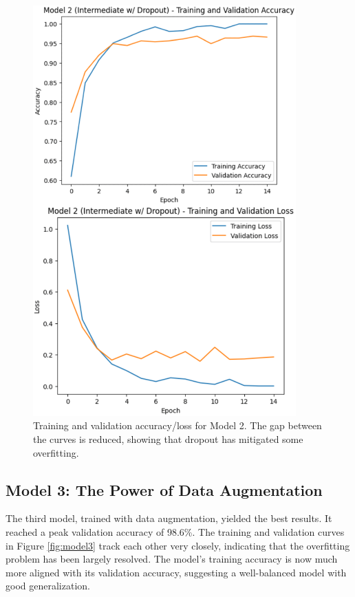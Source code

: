 \documentclass[pdflatex,sn-mathphys-num]{sn-jnl}%
\theoremstyle{thmstyleone}%
\theoremstyle{thmstyletwo}%
\theoremstyle{thmstylethree}%
\begin{document}
\begin{figure}[h]
\centering
\includegraphics[width=0.9\textwidth]{model2_curves.png}
\caption{Training and validation accuracy/loss for Model 2. The gap between the curves is reduced, showing that dropout has mitigated some overfitting.}\label{fig:model2}
\end{figure}

\subsection{Model 3: The Power of Data Augmentation}
The third model, trained with data augmentation, yielded the best results. It reached a peak validation accuracy of 98.6\%. The training and validation curves in Figure \ref{fig:model3} track each other very closely, indicating that the overfitting problem has been largely resolved. The model's training accuracy is now much more aligned with its validation accuracy, suggesting a well-balanced model with good generalization.
\end{document}
